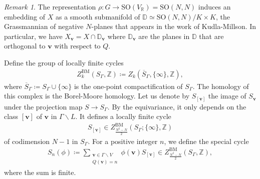 \documentclass[twoside,a4paper,10pt]{article} %
\newcommand{\8}{\infty}
\newcommand{\Z}{\mathbb{Z}}
\newcommand{\vbf}{\mathbf{v}}
\newcommand{\SO}{\mathrm{SO}}
\newcommand{\BM}{\mathrm{BM}}
\newcommand{\D}{\mathbb{D}}
\newcommand{\R}{\mathbb{R}}
\theoremstyle{mytheoremstyle}
\theoremstyle{remark}
\newtheorem{rmk}{Remark}[section]
\numberwithin{equation}{section}
\begin{document}
\begin{rmk} The representation $\rho \colon G \longrightarrow \SO(V_\R) =\SO(N,N)$ induces an embedding of $X$ as a smooth submanifold of $\D \simeq \SO(N,N)/K\times K$, the Grassmannian of negative $N$-planes that appears in the work of Kudla-Millson.
In particular, we have $X_\vbf =X \cap \D_\vbf$ where $\D_\vbf$ are the planes in $\D$ that are orthogonal to $\vbf$ with respect to $Q$.
\end{rmk}
 Define the group of locally finite cycles 
\begin{align}
Z^{\BM}_{k}(S_\Gamma, \Z) \coloneqq Z_{k}(\overline{S}_\Gamma, \{\8\}, \Z),
\end{align}
where $\overline{S}_\Gamma \coloneqq S_\Gamma \cup \{\8\}$ is the one-point compactification of $S_\Gamma$. The homology of this complex is the Borel-Moore homology.
 Let us denote by $S_{[\vbf]}$ the image of $S_\vbf$ under the projection map $S \longrightarrow S_\Gamma$. By the equivariance, it only depends on the class $[\vbf]$ of $\vbf$ in $\Gamma \backslash L$. It defines a locally finite cycle
\begin{align}
S_{[\vbf]} \in Z^{\BM}_{\frac{N^2-N}{2}}(S_\Gamma; \{\8\}, \Z)
\end{align}
of codimension $N-1$ in $S_\Gamma$. For a positive integer $n$, we define the special cycle
\begin{align}
S_n(\phi) \coloneqq \sum_{\substack{ \vbf \in \Gamma \backslash V \\ Q(\vbf)=n}} \phi(\vbf)S_{[\vbf]} \in  Z^{\BM}_{\frac{N^2-N}{2}}(S_\Gamma, \Z),
\end{align}
where the sum is finite.
\end{document}
